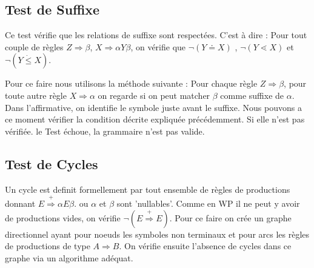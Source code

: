 	\subsection{Test de Suffixe}
		Ce test vérifie que les relations de suffixe sont respectées. C'est à dire :
		Pour tout couple de règles $Z \Longrightarrow \beta$, $X \Longrightarrow \alpha Y \beta$,
		on vérifie que $\neg(Y \doteq X)$ , $\neg(Y \lessdot X)$ et $\neg(Y \dot{\leq} X)$.
		
		Pour ce faire nous utilisons la méthode suivante : 
		Pour chaque règle $Z \Longrightarrow \beta$, pour toute autre règle $X \Longrightarrow \alpha$ on regarde si on peut matcher $\beta$ 
		comme suffixe de $\alpha$.
		Dans l'affirmative, on identifie le symbole juste avant le suffixe. Nous pouvons a ce moment vérifier la
		condition décrite expliquée précédemment. Si elle n'est pas vérifiée. le Test échoue, la grammaire n'est pas valide.

	\subsection{Test de Cycles}
		Un cycle est definit formellement par tout ensemble de règles de productions donnant $E \overset{+}{\Longrightarrow} \alpha E\beta$.
		ou $\alpha$ et $\beta$ sont 'nullables'. 
		Comme en WP il ne peut y avoir de productions vides, on vérifie $\neg(E \overset{+}{\Longrightarrow} E)$. Pour ce faire on 
		crée un graphe directionnel ayant pour noeuds les symboles non terminaux et pour arcs les règles de productions de type
		$A\Longrightarrow B$. On vérifie ensuite l'absence de cycles dans ce graphe via un algorithme adéquat.

